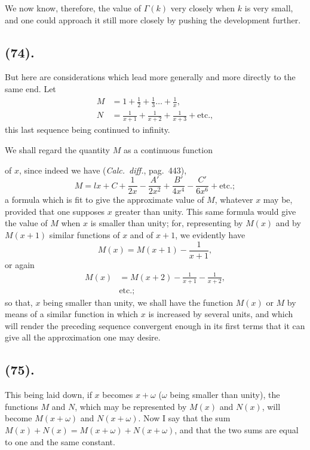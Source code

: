 \documentclass{article}
\begin{document}
We now know, therefore, the value of $\Gamma(k)$ very closely when $k$ is very small, and one could approach it still more closely by pushing the development further.

\subsection*{(74).}

But here are considerations which lead more generally and more directly to the same end. Let
\[ \begin{aligned} M&=1+\tfrac{1}{2}+\tfrac{1}{3}\ldots+\frac{1}{x},\\ N&=\frac{1}{x+1}+\frac{1}{x+2}+\frac{1}{x+3}+\text{etc.}, \end{aligned} \]
this last sequence being continued to infinity.

We shall regard the quantity $M$ as a continuous function

of $x$, since indeed we have (\emph{Calc.\ diff.}, pag.\ 443),
\[ M=lx+C+\frac{1}{2x}-\frac{A'}{2x^{2}}+\frac{B'}{4x^{4}}-\frac{C'}{6x^{6}}+\text{etc.}; \]
a formula which is fit to give the approximate value of $M$, whatever $x$ may be, provided that one supposes $x$ greater than unity. This same formula would give the value of $M$ when $x$ is smaller than unity; for, representing by $M(x)$ and by $M(x+1)$ similar functions of $x$ and of $x+1$, we evidently have
\[ M(x)=M(x+1)-\frac{1}{x+1}, \]
or again
\[ \begin{aligned} M(x)&=M(x+2)-\frac{1}{x+1}-\frac{1}{x+2},\\ &\text{etc.}; \end{aligned} \]
so that, $x$ being smaller than unity, we shall have the function $M(x)$ or $M$ by means of a similar function in which $x$ is increased by several units, and which will render the preceding sequence convergent enough in its first terms that it can give all the approximation one may desire.

\subsection*{(75).}

This being laid down, if $x$ becomes $x+\omega$ ($\omega$ being smaller than unity), the functions $M$ and $N$, which may be represented by $M(x)$ and $N(x)$, will become $M(x+\omega)$ and $N(x+\omega)$. Now I say that the sum $M(x)+N(x)=M(x+\omega)+N(x+\omega)$, and that the two sums are equal to one and the same constant.
\end{document}
